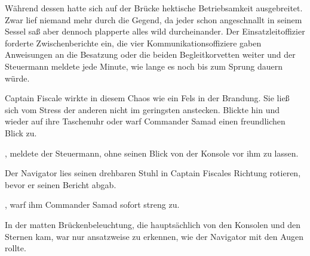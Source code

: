 Während dessen hatte sich auf der Brücke hektische Betriebsamkeit ausgebreitet. Zwar lief niemand mehr durch die Gegend, da jeder schon angeschnallt in seinem Sessel saß aber dennoch plapperte alles wild durcheinander. Der Einsatzleitoffizier forderte Zwischenberichte ein, die vier Kommunikationsoffiziere gaben Anweisungen an die Besatzung oder die beiden Begleitkorvetten weiter und der Steuermann meldete jede Minute, wie lange es noch bis zum Sprung dauern würde.

\par

Captain Fiscale wirkte in diesem Chaos wie ein Fels in der Brandung. Sie ließ sich vom Stress der anderen nicht im geringsten anstecken. Blickte hin und wieder auf ihre Taschenuhr oder warf Commander Samad einen freundlichen Blick zu.

\par

, meldete der Steuermann, ohne seinen Blick von der Konsole vor ihm zu lassen.

\par

Der Navigator lies seinen drehbaren Stuhl in Captain Fiscales Richtung rotieren, bevor er seinen Bericht abgab. 

\par

, warf ihm Commander Samad sofort streng zu. 

\par

In der matten Brückenbeleuchtung, die hauptsächlich von den Konsolen und den Sternen kam, war nur ansatzweise zu erkennen, wie der Navigator mit den Augen rollte.

\par


\par

